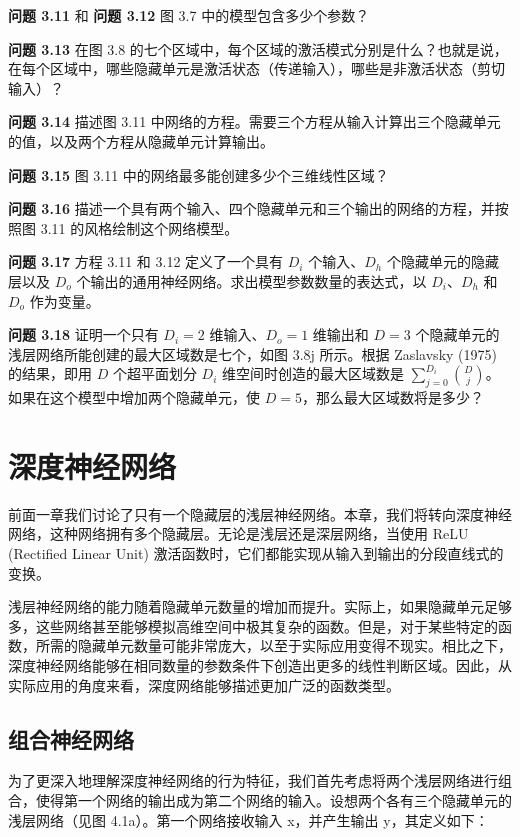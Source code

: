 \documentclass[lang=cn,newtx,10pt,scheme=chinese]{elegantbook}
\begin{document}
\textbf{问题 3.11} 和 \textbf{问题 3.12} 图 3.7 中的模型包含多少个参数？

\textbf{问题 3.13} 在图 3.8 的七个区域中，每个区域的激活模式分别是什么？也就是说，在每个区域中，哪些隐藏单元是激活状态（传递输入），哪些是非激活状态（剪切输入）？

\textbf{问题 3.14} 描述图 3.11 中网络的方程。需要三个方程从输入计算出三个隐藏单元的值，以及两个方程从隐藏单元计算输出。

\textbf{问题 3.15} 图 3.11 中的网络最多能创建多少个三维线性区域？

\textbf{问题 3.16} 描述一个具有两个输入、四个隐藏单元和三个输出的网络的方程，并按照图 3.11 的风格绘制这个网络模型。

\textbf{问题 3.17} 方程 3.11 和 3.12 定义了一个具有 \(D_i\) 个输入、\(D_h\) 个隐藏单元的隐藏层以及 \(D_o\) 个输出的通用神经网络。求出模型参数数量的表达式，以 \(D_i\)、\(D_h\) 和 \(D_o\) 作为变量。

\textbf{问题 3.18} 证明一个只有 \(D_i = 2\) 维输入、\(D_o = 1\) 维输出和 \(D = 3\) 个隐藏单元的浅层网络所能创建的最大区域数是七个，如图 3.8j 所示。根据 Zaslavsky (1975) 的结果，即用 \(D\) 个超平面划分 \(D_i\) 维空间时创造的最大区域数是 \(\sum_{j=0}^{D_i} \binom{D}{j}\)。如果在这个模型中增加两个隐藏单元，使 \(D = 5\)，那么最大区域数将是多少？

\chapter{深度神经网络}

前面一章我们讨论了只有一个隐藏层的浅层神经网络。本章，我们将转向深度神经网络，这种网络拥有多个隐藏层。无论是浅层还是深层网络，当使用 ReLU (Rectified Linear Unit) 激活函数时，它们都能实现从输入到输出的分段直线式的变换。

浅层神经网络的能力随着隐藏单元数量的增加而提升。实际上，如果隐藏单元足够多，这些网络甚至能够模拟高维空间中极其复杂的函数。但是，对于某些特定的函数，所需的隐藏单元数量可能非常庞大，以至于实际应用变得不现实。相比之下，深度神经网络能够在相同数量的参数条件下创造出更多的线性判断区域。因此，从实际应用的角度来看，深度网络能够描述更加广泛的函数类型。

\section{组合神经网络}

为了更深入地理解深度神经网络的行为特征，我们首先考虑将两个浅层网络进行组合，使得第一个网络的输出成为第二个网络的输入。设想两个各有三个隐藏单元的浅层网络（见图 4.1a）。第一个网络接收输入 x，并产生输出 y，其定义如下：
\end{document}
